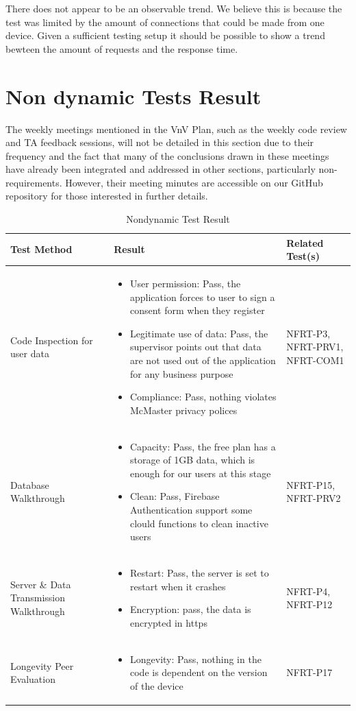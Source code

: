 \documentclass[12pt, titlepage]{article}
\begin{document}
There does not appear to be an observable trend. We believe this is because the test was limited by the amount of connections that could be made from one device.
Given a sufficient testing setup it should be possible to show a trend bewteen the amount of requests and the response time.

\section{Non dynamic Tests Result}\label{static}
The weekly meetings mentioned in the VnV Plan, such as the weekly code review and TA feedback sessions, will not be detailed in this section due to their frequency and the fact that many of the conclusions drawn in these meetings have already been integrated and addressed in other sections, particularly non-requirements. However, their meeting minutes are accessible on our GitHub repository for those interested in further details.
\begin{table}[H]
\caption{Nondynamic Test Result}
\begin{tabular}{|p{0.3\linewidth} | p{0.5\linewidth}| p{0.2\linewidth} |}
\hline
\multicolumn{1}{|l}{\bfseries Test Method} & \multicolumn{1}{|l|}{\bfseries Result} & \multicolumn{1}{l|}{\bfseries Related Test(s)}\\
\hline
Code Inspection for user data & 
\begin{itemize}
\item User permission: Pass, the application forces to user to sign a consent form when they register
\item Legitimate use of data: Pass, the supervisor points out that data are not used out of the application for any business purpose
\item Compliance: Pass, nothing violates McMaster privacy polices
\end{itemize} & NFRT-P3, NFRT-PRV1, NFRT-COM1 \\
\hline
Database Walkthrough & 
\begin{itemize}
\item Capacity: Pass, the free plan has a storage of 1GB data, which is enough for our users at this stage
\item Clean: Pass, Firebase Authentication support some clould functions to clean inactive users
\end{itemize}& NFRT-P15, NFRT-PRV2\\
\hline
Server \& Data Transmission Walkthrough & 
\begin{itemize}
\item Restart: Pass, the server is set to restart when it crashes
\item Encryption: pass, the data is encrypted in https
\end{itemize} & NFRT-P4, NFRT-P12 \\
\hline
Longevity Peer Evaluation & 
\begin{itemize}
\item Longevity: Pass, nothing in the code is dependent on the version of the device
\end{itemize} & NFRT-P17\\
\hline
\end{tabular}
\end{table}
\end{document}
